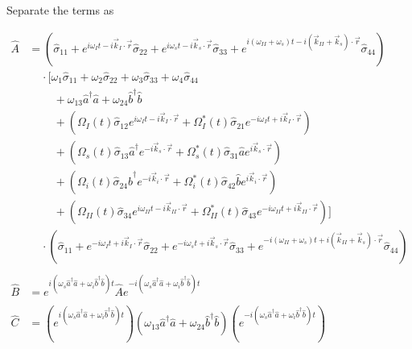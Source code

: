 \documentclass[aps,pra,showpacs,amsmath,amssymb,nofootinbib,longbibliography,superscriptaddress
]{revtex4-1}
\theoremstyle{definition}
\theoremstyle{remark}
\newcommand{\0}{\hat{0}}
\begin{document}
Separate the terms as

\begin{align}
    \hat{A}
    &=
    \left(\hat{\sigma}_{11} + e^{i \omega_I t - i \vec{k}_I \cdot \vec{r}} \hat{\sigma}_{22} + e^{i \omega_s t - i \vec{k}_s \cdot \vec{r}} \hat{\sigma}_{33} + e^{i(\omega_{II} + \omega_s) t - i(\vec{k}_{II} + \vec{k}_s) \cdot \vec{r}} \hat{\sigma}_{44}\right) \nonumber\\
    &\;\;\;\;\cdot\biggl[
        \omega_1 \hat{\sigma}_{11} + \omega_2 \hat{\sigma}_{22} + \omega_3 \hat{\sigma}_{33} + \omega_4 \hat{\sigma}_{44}\nonumber \\
        &\;\;\;\;\;\;\;\;+ \omega_{13} \hat{a}^{\dagger} \hat{a} + \omega_{24} \hat{b}^{\dagger} \hat{b}\nonumber \\
        &\;\;\;\;\;\;\;\;+ \left(\Omega_{I}(t) \hat{\sigma}_{12} e^{i \omega_I t - i \vec{k}_I \cdot \vec{r}} + \Omega_{I}^*(t) \hat{\sigma}_{21} e^{-i \omega_I t + i \vec{k}_I \cdot \vec{r}}\right)\nonumber \\
        &\;\;\;\;\;\;\;\;+ \left(\Omega_{s}(t) \hat{\sigma}_{13} \hat{a}^{\dagger} e^{-i \vec{k}_{s} \cdot \vec{r}} + \Omega_{s}^*(t) \hat{\sigma}_{31} \hat{a} e^{i \vec{k}_{s} \cdot \vec{r}}\right)\nonumber \\
        &\;\;\;\;\;\;\;\;+ \left(\Omega_{i}(t) \hat{\sigma}_{24} \hat{b}^{\dagger} e^{-i \vec{k}_{i} \cdot \vec{r}} + \Omega_{i}^*(t) \hat{\sigma}_{42} \hat{b} e^{i \vec{k}_{i} \cdot \vec{r}}\right)\nonumber \\
        &\;\;\;\;\;\;\;\;+ \left(\Omega_{II}(t) \hat{\sigma}_{34} e^{i \omega_{II} t - i \vec{k}_{II} \cdot \vec{r}} + \Omega_{II}^*(t) \hat{\sigma}_{43} e^{-i \omega_{II} t + i \vec{k}_{II} \cdot \vec{r}}\right)
    \biggr] \nonumber\\
    &\;\;\;\; \cdot
    \left(\hat{\sigma}_{11} + e^{-i \omega_I t + i \vec{k}_I \cdot \vec{r}} \hat{\sigma}_{22} + e^{-i \omega_s t + i \vec{k}_s \cdot \vec{r}} \hat{\sigma}_{33} + e^{-i(\omega_{II} + \omega_s) t + i(\vec{k}_{II} + \vec{k}_s) \cdot \vec{r}} \hat{\sigma}_{44}\right)\\\nonumber\\
    \hat{B}
    &=
    e^{i(\omega_s \hat{a}^{\dagger} \hat{a} + \omega_i \hat{b}^{\dagger} \hat{b})t} \hat{A} e^{-i(\omega_s \hat{a}^{\dagger} \hat{a} + \omega_i \hat{b}^{\dagger} \hat{b})t} \label{Beq} \\\nonumber\\
    \hat{C}
    &=
    \left(e^{i(\omega_s \hat{a}^{\dagger} \hat{a} + \omega_i \hat{b}^{\dagger} \hat{b})t}\right) \left(\omega_{13} \hat{a}^{\dagger}\hat{a} + \omega_{24} \hat{b}^{\dagger}\hat{b}\right)\left(e^{-i(\omega_s \hat{a}^{\dagger} \hat{a} + \omega_i \hat{b}^{\dagger} \hat{b})t}\right) \label{Unsimplified_C_eq}
\end{align}
\end{document}
